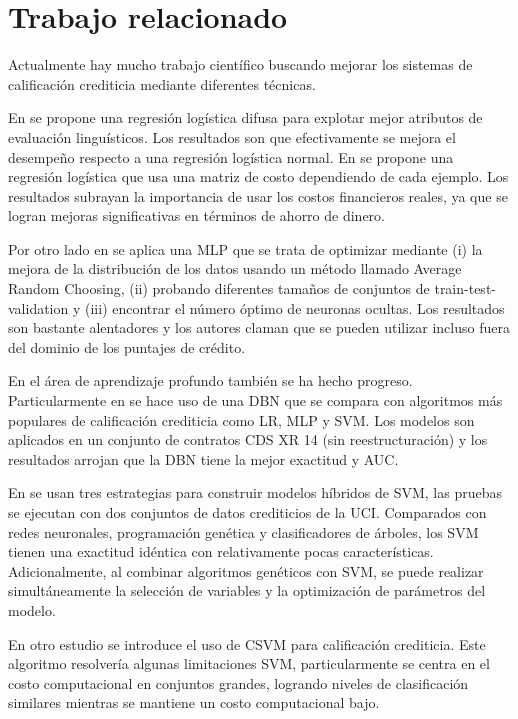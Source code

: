 \section{Trabajo relacionado}

Actualmente hay mucho trabajo científico buscando mejorar los sistemas de calificación crediticia mediante diferentes técnicas.

En \citep{sohn2016technology} se propone una regresión logística difusa para explotar mejor atributos de evaluación linguísticos. Los resultados son que efectivamente se mejora el desempeño respecto a una regresión logística normal. En \citep{bahnsen2014example} se propone una regresión logística que usa una matriz de costo dependiendo de cada ejemplo. Los resultados subrayan la importancia de usar los costos financieros reales, ya que se logran mejoras significativas en términos de ahorro de dinero.

Por otro lado en \citep{zhao2015investigation} se aplica una \ac{MLP} que se trata de optimizar mediante (i) la mejora de la distribución de los datos usando un método llamado Average Random Choosing, (ii) probando diferentes tamaños de conjuntos de train-test-validation y (iii) encontrar el número óptimo de neuronas ocultas. Los resultados son bastante alentadores y los autores claman que se pueden utilizar incluso fuera del dominio de los puntajes de crédito.

En el área de aprendizaje profundo también se ha hecho progreso. Particularmente en \citep{luo2017deep} se hace uso de una \ac{DBN} que se compara con algoritmos más populares de calificación crediticia como \ac{LR}, \ac{MLP} y \ac{SVM}. Los modelos son aplicados en un conjunto de contratos CDS XR 14 (sin reestructuración) y los resultados arrojan que la \ac{DBN} tiene la mejor exactitud y AUC.

En \citep{huang2007credit} se usan tres estrategias para construir modelos híbridos de \ac{SVM}, las pruebas se ejecutan con dos conjuntos de datos crediticios de la UCI. Comparados con redes neuronales, programación genética y clasificadores de árboles, los \ac{SVM} tienen una exactitud idéntica con relativamente pocas características. Adicionalmente, al combinar algoritmos genéticos con \ac{SVM}, se puede realizar simultáneamente la selección de variables y la optimización de parámetros del modelo. 

En otro estudio \citep{harris2015credit} se introduce el uso de \ac{CSVM} para calificación crediticia. Este algoritmo resolvería algunas limitaciones \ac{SVM}, particularmente se centra en el costo computacional en conjuntos grandes, logrando niveles de clasificación similares mientras se mantiene un costo computacional bajo.

